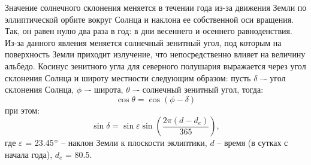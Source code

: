 \documentclass[a4paper, fontsize=14pt]{scrartcl}
\begin{document}
Значение солнечного склонения меняется в течении года из-за движения Земли по эллиптической орбите вокруг Солнца и наклона ее собственной оси вращения. Так, он равен нулю два раза в год: в дни весеннего и осеннего равноденствия. Из-за данного явления меняется солнечный зенитный угол, под которым на поверхность Земли приходит излучение, что непосредственно влияет на величину альбедо. Косинус зенитного угла для северного полушария выражается через угол склонения Солнца и широту местности следующим образом: пусть $\delta$ –- угол склонения Солнца, $\phi$ –- широта, $\theta$ –- солнечный зенитный угол, тогда:
\begin{equation}
    \cos \theta = \cos ( \phi - \delta ) \label{sys}
\end{equation}
при этом:
\begin{equation}
    \sin \delta = \sin \varepsilon \sin \left(\dfrac{2 \pi (d - d_e)}{365} \right) ,  \label{sys}
\end{equation}
где $\varepsilon$ = 23.45$\degree$  – наклон Земли к плоскости эклиптики, $d$ – время (в сутках с начала года), $d_e$ = 80.5.
\end{document}
